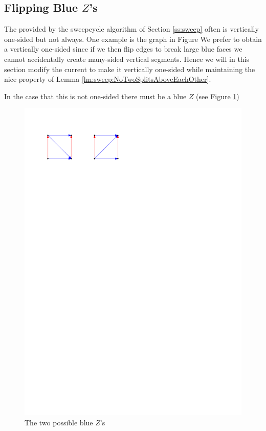 
\subsection{Flipping Blue $Z$'s}
\thispagestyle{plain}
\label{ss:flipBlueZ}

  The \rel provided by the sweepcycle algorithm of Section \ref{ss:sweep} often is vertically one-sided but not always. One example is the graph in Figure 
  We prefer to obtain a vertically one-sided \rel since if we then flip edges to break large blue faces we cannot accidentally create many-sided vertical segments. Hence we will in this section modify the current \rel to make it vertically one-sided while maintaining the nice property of Lemma \ref{lm:sweep:NoTwoSplitsAboveEachOther}.


  In the case that this \rel is not one-sided there must be a blue $Z$ (see Figure \ref{fig:zflip:blueZ})

  \begin{figure}[h]
    \centering
    \includegraphics[scale=1]{unifiedAlgo/img/zflip/blueZ.pdf}
    \caption{The two possible blue $Z$'s}
    \label{fig:zflip:blueZ}
  \end{figure}

